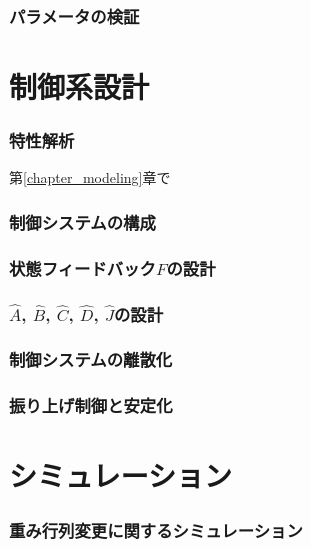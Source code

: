 \documentclass[a4j,11pt,twoside]{jbook}
\begin{document}
\subsection{パラメータの検証}


\chapter{制御系設計}
\subsection{特性解析}
第\ref{chapter_modeling}章で

\subsection{制御システムの構成}

\subsection{状態フィードバック$F$の設計}

\subsection{$\hat{A}$, $\hat{B}$, $\hat{C}$, $\hat{D}$, $\hat{J}$の設計}

\subsection{制御システムの離散化}

\subsection{振り上げ制御と安定化}




\chapter{シミュレーション}

\subsection{重み行列変更に関するシミュレーション}
\end{document}
